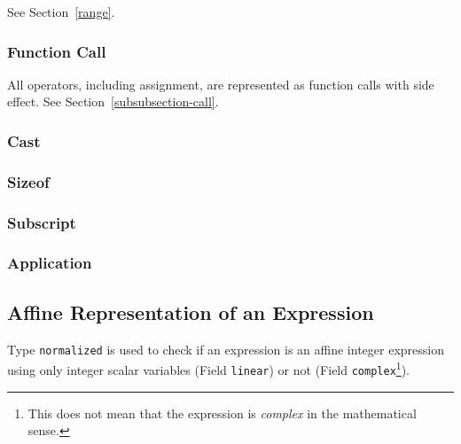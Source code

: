 \documentclass[a4paper]{article}
\begin{document}
See Section~\ref{range}.

\subsubsection{Function Call}

All operators, including assignment, are represented as function calls
with side effect. See Section~\ref{subsubsection-call}.


\subsubsection{Cast}
\label{subsubsection-cast}

{}

\subsubsection{Sizeof}
\label{subsubsection-sizeof}

{}

\subsubsection{Subscript}
\label{subsubsection-subscript}

{}

\subsubsection{Application}
\label{subsubsection-application}

{}

\subsection{Affine Representation of an Expression}
\label{subsection-normalized}

{}

Type \verb/normalized/ is used to check if an expression is an affine
integer expression using only integer scalar variables (Field
\verb/linear/) or not (Field \verb/complex/\footnote{This does not mean
that the expression is \emph{complex} in the mathematical sense.}).
\end{document}
